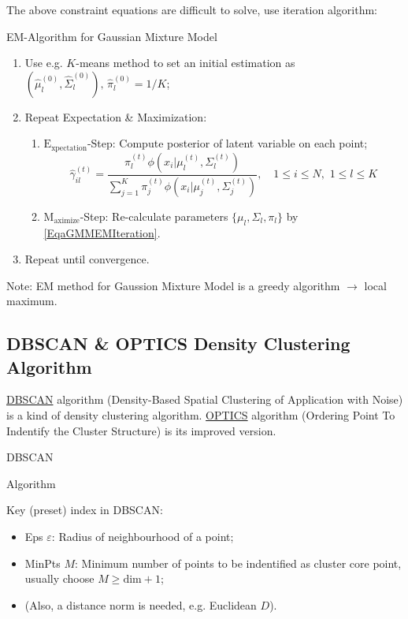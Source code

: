     The above constraint equations are difficult to solve, use iteration algorithm:
\begin{algorithm}{EM-Algorithm for Gaussian Mixture Model}
    \begin{enumerate}[topsep=2pt,itemsep=2pt]
        \item Use e.g. $ K $-means method to set an initial estimation as $ (\hat{\mu}^{(0)}_l,\hat{\Sigma }_l^{(0)}),\,\hat{\pi}_l^{(0)}=1/K$;
        \item Repeat Expectation \& Maximization:
        \begin{enumerate}[topsep=2pt,itemsep=2pt]
            \item $ \mathrm{E_{xpectation}} $-Step: Compute posterior of latent variable on each point;
        \begin{equation}
            \hat{\gamma }_{il}^{(t)}=\dfrac{\pi_l^{(t)}\phi(x_i|\mu _l^{(t)},\Sigma _l^{(t)})}{\sum\limits_{j=1}^K\pi_j^{(t)}\phi (x_i|\mu _j^{(t)},\Sigma _j^{(t)})} ,\quad  1\leq i\leq N,\,\, 1\leq l\leq K
        \end{equation}
        \item $ \mathrm{M_{aximize}} $-Step: Re-calculate parameters $ \{\mu_l,\Sigma _l,\pi_l\} $ by \autoref{EqaGMMEMIteration}.
        \end{enumerate}
        \item Repeat until convergence.
    \end{enumerate}
\end{algorithm}
    
    Note: EM method for Gaussion Mixture Model is a greedy algorithm $ \longrightarrow $ local maximum.
    
\subsection{DBSCAN \& OPTICS Density Clustering Algorithm}
    \hyperlink{DBSCAN}{DBSCAN} algorithm (Density-Based Spatial Clustering of Application with Noise) is a kind of density clustering algorithm. \hyperlink{OPTICS}{OPTICS} algorithm (Ordering Point To Indentify the Cluster Structure) is its improved version.


\begin{point}
    \hypertarget{DBSCAN}{DBSCAN} Algorithm
\end{point}
    Key (preset) index in DBSCAN:
    \begin{itemize}[topsep=2pt,itemsep=2pt]
        \item Eps $ \varepsilon  $: Radius of neighbourhood of a point;
        \item MinPts $ M $: Minimum number of points to be indentified as cluster core point, usually choose $ M\geq \mathrm{dim}+1 $;
        \item (Also, a distance norm is needed, e.g. Euclidean $ D $).
    \end{itemize}
    
